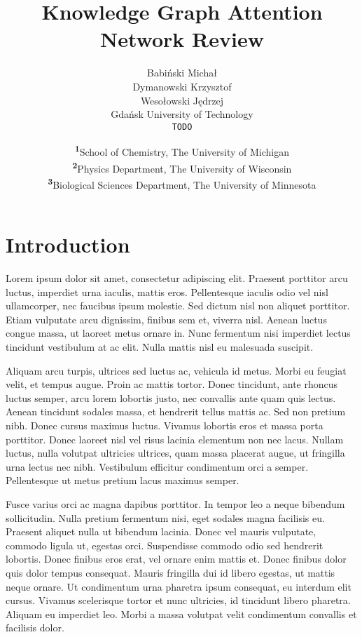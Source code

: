 \documentclass[a4paper]{LTJournalArticle}
\title{Knowledge Graph Attention Network Review}
\author{Babiński Michał \\
        Dymanowski Krzysztof \\
        Wesołowski Jędrzej \\
        Gdańsk University of Technology \\
        \texttt{TODO}}
\date{\footnotesize\textsuperscript{\textbf{1}}School of Chemistry, The University of Michigan\\ \textsuperscript{\textbf{2}}Physics Department, The University of Wisconsin\\ \textsuperscript{\textbf{3}}Biological Sciences Department, The University of Minnesota}
\begin{document}
	
	\maketitle %
	
	
	\section{Introduction}
	
	Lorem ipsum dolor sit amet, consectetur adipiscing elit. Praesent porttitor arcu luctus, imperdiet urna iaculis, mattis eros. Pellentesque iaculis odio vel nisl ullamcorper, nec faucibus ipsum molestie. Sed dictum nisl non aliquet porttitor. Etiam vulputate arcu dignissim, finibus sem et, viverra nisl. Aenean luctus congue massa, ut laoreet metus ornare in. Nunc fermentum nisi imperdiet lectus tincidunt vestibulum at ac elit. Nulla mattis nisl eu malesuada suscipit.
	
	Aliquam arcu turpis, ultrices sed luctus ac, vehicula id metus. Morbi eu feugiat velit, et tempus augue. Proin ac mattis tortor. Donec tincidunt, ante rhoncus luctus semper, arcu lorem lobortis justo, nec convallis ante quam quis lectus. Aenean tincidunt sodales massa, et hendrerit tellus mattis ac. Sed non pretium nibh. Donec cursus maximus luctus. Vivamus lobortis eros et massa porta porttitor. Donec laoreet nisl vel risus lacinia elementum non nec lacus. Nullam luctus, nulla volutpat ultricies ultrices, quam massa placerat augue, ut fringilla urna lectus nec nibh. Vestibulum efficitur condimentum orci a semper. Pellentesque ut metus pretium lacus maximus semper.
	
	Fusce varius orci ac magna dapibus porttitor. In tempor leo a neque bibendum sollicitudin. Nulla pretium fermentum nisi, eget sodales magna facilisis eu. Praesent aliquet nulla ut bibendum lacinia. Donec vel mauris vulputate, commodo ligula ut, egestas orci. Suspendisse commodo odio sed hendrerit lobortis. Donec finibus eros erat, vel ornare enim mattis et. Donec finibus dolor quis dolor tempus consequat. Mauris fringilla dui id libero egestas, ut mattis neque ornare. Ut condimentum urna pharetra ipsum consequat, eu interdum elit cursus. Vivamus scelerisque tortor et nunc ultricies, id tincidunt libero pharetra. Aliquam eu imperdiet leo. Morbi a massa volutpat velit condimentum convallis et facilisis dolor.
	
\end{document}
